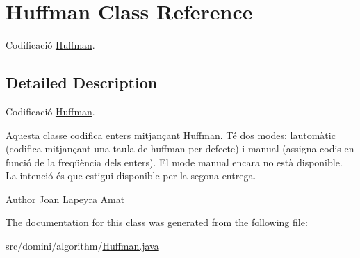\hypertarget{classHuffman}{}\section{Huffman Class Reference}
\label{classHuffman}


Codificació \hyperlink{classHuffman}{Huffman}.  




\subsection{Detailed Description}
Codificació \hyperlink{classHuffman}{Huffman}. 

Aquesta classe codifica enters mitjançant \hyperlink{classHuffman}{Huffman}. Té dos modes\+: l\textquotesingle{}automàtic (codifica mitjançant una taula de huffman per defecte) i manual (assigna codis en funció de la freqüència dels enters). El mode manual encara no està disponible. La intenció és que estigui disponible per la segona entrega.

\begin{DoxyAuthor}{Author}
Joan Lapeyra Amat 
\end{DoxyAuthor}


The documentation for this class was generated from the following file\+:\begin{DoxyCompactItemize}
\item 
src/domini/algorithm/\hyperlink{Huffman_8java}{Huffman.\+java}\end{DoxyCompactItemize}
